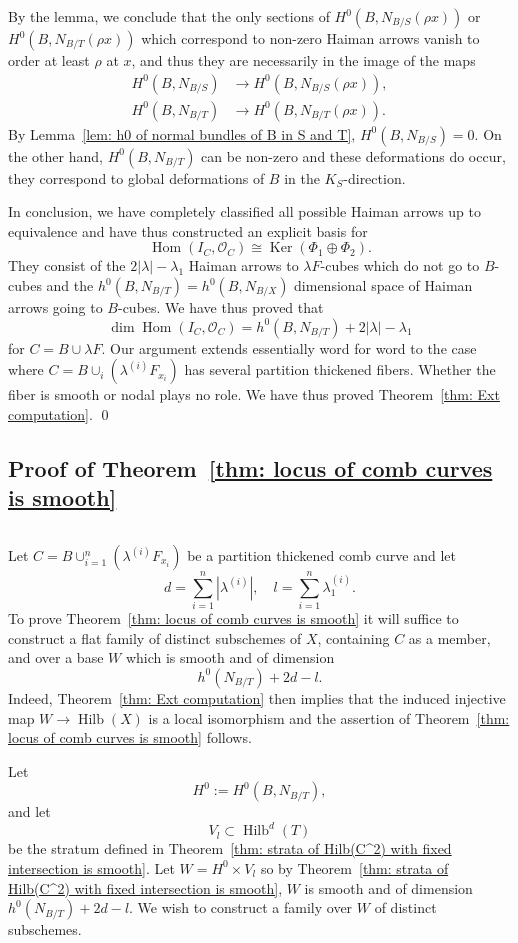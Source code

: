 \documentclass[12pt]{amsart}
\theoremstyle{definition}
\renewcommand{\O}{\mathcal{O}}
\newcommand{\Hom}{\operatorname{Hom}}
\newcommand{\Ker}{\operatorname{Ker}}
\newcommand{\Hilb}{\operatorname{Hilb}}
\newcommand{\SubSecSpace}{$\,$\vspace{0.2cm}\par } %
\begin{document}
By the lemma, we conclude that the only sections of
$H^{0}(B,N_{B/S}(\rho x))$ or $H^{0}(B,N_{B/T}(\rho x))$ which
correspond to non-zero Haiman arrows vanish to order at least $\rho$
at $x$, and thus they are necessarily in the image of the maps
\begin{align*}
H^{0}(B,N_{B/S})&\to H^{0}(B,N_{B/S}(\rho x)),\\
H^{0}(B,N_{B/T})&\to H^{0}(B,N_{B/T}(\rho x)).
\end{align*}
By Lemma~\ref{lem: h0 of normal bundles of B in S and T},
$H^{0}(B,N_{B/S})=0$. On the other hand, $H^{0}(B,N_{B/T})$ can be
non-zero and these deformations do occur, they correspond to global
deformations of $B$ in the $K_{S}$-direction.

In conclusion, we have completely classified all possible Haiman
arrows up to equivalence and have thus constructed an explicit basis
for 
\[
\Hom (I_{C},\O_{C})\cong \Ker (\Phi_{1}\oplus \Phi_{2}).
\]
They consist of the $2|\lambda |-\lambda_{1}$ Haiman arrows to
$\lambda F$-cubes which do not go to $B$-cubes and the
$h^{0}(B,N_{B/T})=h^{0}(B,N_{B/X})$ dimensional space of Haiman arrows
going to $B$-cubes. We have thus proved that
\[
\dim \Hom (I_{C},\O_{C}) = h^{0}(B,N_{B/T}) + 2|\lambda |-\lambda_{1}
\]
for $C=B\cup \lambda F$. Our argument extends essentially word for
word to the case where $C=B\cup_{i}(\lambda^{(i)}F_{x_{i}})$ has
several partition thickened fibers. Whether the fiber is smooth or
nodal plays no role. We have thus proved Theorem~\ref{thm: Ext
computation}. \qed 

\subsection{Proof of Theorem~\ref{thm: locus of comb curves is smooth}}\SubSecSpace 

Let $C=B\cup_{i=1}^{n}\left(\lambda^{(i)}F_{x_{i}} \right)$ be a
partition thickened comb curve and let 
\[
d=\sum_{i=1}^{n} |\lambda^{(i)}|,\quad l=\sum_{i=1}^{n}\lambda_{1}^{(i)}.
\]
To prove Theorem~\ref{thm: locus of comb curves is smooth} it will
suffice to construct a flat family of distinct subschemes of $X$,
containing $C$ as a member, and over a base $W$ which is smooth and of
dimension
\[
h^{0}(N_{B/T}) + 2d - l.
\]
Indeed, Theorem~\ref{thm: Ext computation} then implies that the
induced injective map $W\to \Hilb (X)$ is a local isomorphism and the
assertion of Theorem~\ref{thm: locus of comb curves is smooth}
follows.

Let 
\[
H^{0}:=H^{0}(B,N_{B/T}),
\]
and let 
\[
V_{l}\subset \Hilb^{d}(T)
\]
be the stratum defined in Theorem~\ref{thm: strata of Hilb(C^2) with
fixed intersection is smooth}. Let $W=H^{0}\times V_{l}$ so by
Theorem~\ref{thm: strata of Hilb(C^2) with fixed intersection is
smooth}, $W$ is smooth and of dimension $h^{0}(N_{B/T})+2d-l$. We wish
to construct a family over $W$ of distinct subschemes.
\end{document}
